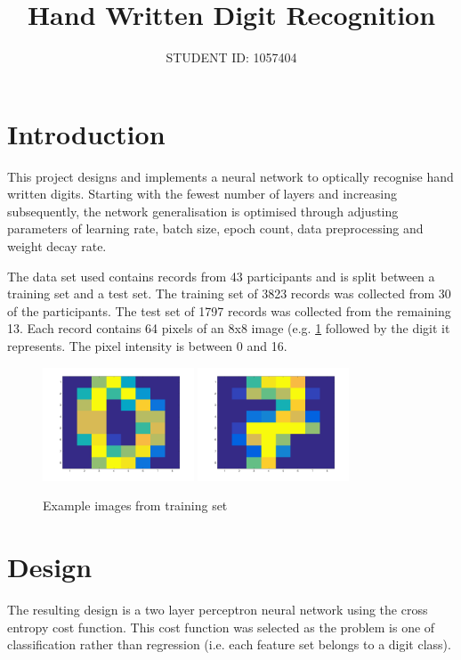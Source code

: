 \documentclass[11]{article}
\title{
  Hand Written
  Digit Recognition
  }
\date{}
\author{STUDENT ID: 1057404 }
\begin{document}
\maketitle 	

\section{Introduction}
This project designs and implements a neural network to optically recognise hand written digits. Starting with the fewest number of layers and increasing subsequently, the network generalisation is optimised through adjusting parameters of learning rate, batch size, epoch count, data preprocessing and weight decay rate.

The data set used contains records from 43 participants and is split between a training set and a test set. The training set of 3823 records was collected from 30 of the participants. The test set of 1797 records was collected from the remaining 13. Each record contains 64 pixels of an 8x8 image (e.g. \ref{fig:digits} followed by the digit it represents. The pixel intensity is between 0 and 16. 

\begin{figure}[h]
\centering
\includegraphics[width=0.4\textwidth]{zero.png}
\includegraphics[width=0.4\textwidth]{seven.png}
\caption{Example images from training set}
\label{fig:digits}
\end{figure}
\section{Design}

The resulting design is a two layer perceptron neural network using the cross entropy cost function. This cost function was selected as the problem is one of classification rather than regression (i.e. each feature set belongs to a digit class).
\end{document}
